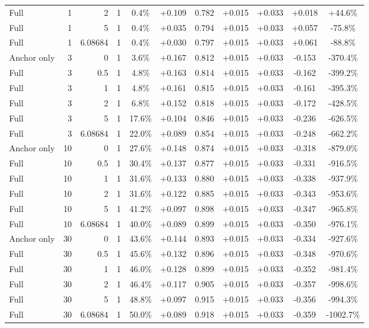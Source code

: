 \begin{table}[htbp]
\begin{tabular}{lrrrccccccc}
Full & 1 & 2 & 1 & 0.4\% & +0.109 & 0.782 & +0.015 & +0.033 & +0.018 & +44.6\% \\
Full & 1 & 5 & 1 & 0.4\% & +0.035 & 0.794 & +0.015 & +0.033 & +0.057 & -75.8\% \\
Full & 1 & 6.08684 & 1 & 0.4\% & +0.030 & 0.797 & +0.015 & +0.033 & +0.061 & -88.8\% \\
Anchor only & 3 & 0 & 1 & 3.6\% & +0.167 & 0.812 & +0.015 & +0.033 & -0.153 & -370.4\% \\
Full & 3 & 0.5 & 1 & 4.8\% & +0.163 & 0.814 & +0.015 & +0.033 & -0.162 & -399.2\% \\
Full & 3 & 1 & 1 & 4.8\% & +0.161 & 0.815 & +0.015 & +0.033 & -0.161 & -395.3\% \\
Full & 3 & 2 & 1 & 6.8\% & +0.152 & 0.818 & +0.015 & +0.033 & -0.172 & -428.5\% \\
Full & 3 & 5 & 1 & 17.6\% & +0.104 & 0.846 & +0.015 & +0.033 & -0.236 & -626.5\% \\
Full & 3 & 6.08684 & 1 & 22.0\% & +0.089 & 0.854 & +0.015 & +0.033 & -0.248 & -662.2\% \\
Anchor only & 10 & 0 & 1 & 27.6\% & +0.148 & 0.874 & +0.015 & +0.033 & -0.318 & -879.0\% \\
Full & 10 & 0.5 & 1 & 30.4\% & +0.137 & 0.877 & +0.015 & +0.033 & -0.331 & -916.5\% \\
Full & 10 & 1 & 1 & 31.6\% & +0.133 & 0.880 & +0.015 & +0.033 & -0.338 & -937.9\% \\
Full & 10 & 2 & 1 & 31.6\% & +0.122 & 0.885 & +0.015 & +0.033 & -0.343 & -953.6\% \\
Full & 10 & 5 & 1 & 41.2\% & +0.097 & 0.898 & +0.015 & +0.033 & -0.347 & -965.8\% \\
Full & 10 & 6.08684 & 1 & 40.0\% & +0.089 & 0.899 & +0.015 & +0.033 & -0.350 & -976.1\% \\
Anchor only & 30 & 0 & 1 & 43.6\% & +0.144 & 0.893 & +0.015 & +0.033 & -0.334 & -927.6\% \\
Full & 30 & 0.5 & 1 & 45.6\% & +0.132 & 0.896 & +0.015 & +0.033 & -0.348 & -970.6\% \\
Full & 30 & 1 & 1 & 46.0\% & +0.128 & 0.899 & +0.015 & +0.033 & -0.352 & -981.4\% \\
Full & 30 & 2 & 1 & 46.4\% & +0.117 & 0.905 & +0.015 & +0.033 & -0.357 & -998.6\% \\
Full & 30 & 5 & 1 & 48.8\% & +0.097 & 0.915 & +0.015 & +0.033 & -0.356 & -994.3\% \\
Full & 30 & 6.08684 & 1 & 50.0\% & +0.089 & 0.918 & +0.015 & +0.033 & -0.359 & -1002.7\% \\

\end{tabular}
\end{table}
